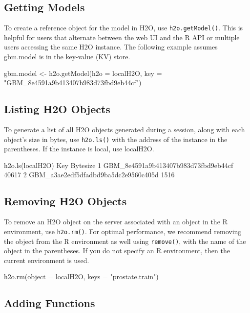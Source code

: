 \subsection{Getting Models}
To create a reference object for the model in H2O, use {\texttt{h2o.getModel()}}. This is helpful for  users that alternate between the web UI and the R API or multiple users accessing the same H2O instance. The following example assumes gbm.model is in the key-value (KV) store.
\begin{spverbatim}
gbm.model <- h2o.getModel(h2o = localH2O, key = "GBM_8e4591a9b413407b983d73fbd9eb44cf")
\end{spverbatim}

\subsection{Listing H2O Objects}

To generate a list of all H2O objects generated during a session, along with each object’s size in bytes, use {\texttt{h2o.ls()}} with the address of the instance in the parentheses. If the instance is local, use localH2O. 

\begin{spverbatim}
h2o.ls(localH2O)
                                                   Key       Bytesize
      1               GBM_8e4591a9b413407b983d73fbd9eb44cf    40617
      2               GBM_a3ae2edf5dfadbd9ba5dc2e9560c405d     1516
\end{spverbatim}


\subsection{Removing H2O Objects}

To remove an H2O object on the server associated with an object in the R environment, use {\texttt{h2o.rm()}}. For optimal performance, we recommend removing the object from the R environment as well using {\texttt{remove()}}, with the name of the object in the parentheses. If you do not specify an R environment, then the current environment is used. 
\begin{spverbatim}
h2o.rm(object = localH2O, keys = "prostate.train")
\end{spverbatim}


\subsection{Adding Functions}

